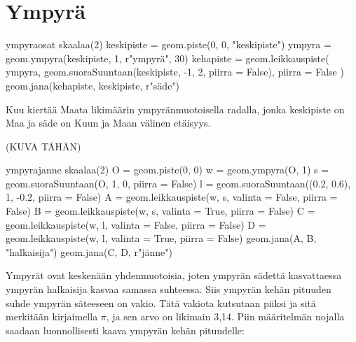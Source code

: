\section*{Ympyrä}

\begin{luoKuva}{ympyraosat}
	skaalaa(2)
	keskipiste = geom.piste(0, 0, "keskipiste")
	ympyra = geom.ympyra(keskipiste, 1, r"ympyr\"{a}", 30)
	kehapiste = geom.leikkauspiste(
		ympyra, geom.suoraSuuntaan(keskipiste, -1, 2, piirra = False), piirra = False
	)
	geom.jana(kehapiste, keskipiste, r"s\"{a}de")
\end{luoKuva}
\begin{center}
\end{center}

\begin{esimerkki}
Kuu kiertää Maata likimäärin ympyränmuotoisella radalla, jonka keskipiste on Maa ja säde on Kuun ja Maan välinen etäisyys.
\end{esimerkki}

(KUVA TÄHÄN)

\begin{luoKuva}{ympyrajanne}
	skaalaa(2)
	O = geom.piste(0, 0)
	w = geom.ympyra(O, 1)
	s = geom.suoraSuuntaan(O, 1, 0, piirra = False)
	l = geom.suoraSuuntaan((0.2, 0.6), 1, -0.2, piirra = False)
	A = geom.leikkauspiste(w, s, valinta = False, piirra = False)
	B = geom.leikkauspiste(w, s, valinta = True, piirra = False)
	C = geom.leikkauspiste(w, l, valinta = False, piirra = False)
	D = geom.leikkauspiste(w, l, valinta = True, piirra = False)
	geom.jana(A, B, "halkaisija")
	geom.jana(C, D, r"j\"{a}nne")
\end{luoKuva}
\begin{center}
\end{center}

Ympyrät ovat keskenään yhdenmuotoisia, joten ympyrän sädettä kasvattaessa ympyrän halkaisija kasvaa samassa suhteessa. Siis ympyrän kehän pituuden suhde ympyrän säteeseen on vakio. Tätä vakiota kutsutaan piiksi ja sitä merkitään kirjaimella $\pi$, ja sen arvo on likimain 3,14. Piin määritelmän nojalla saadaan luonnollisesti kaava ympyrän kehän pituudelle:

